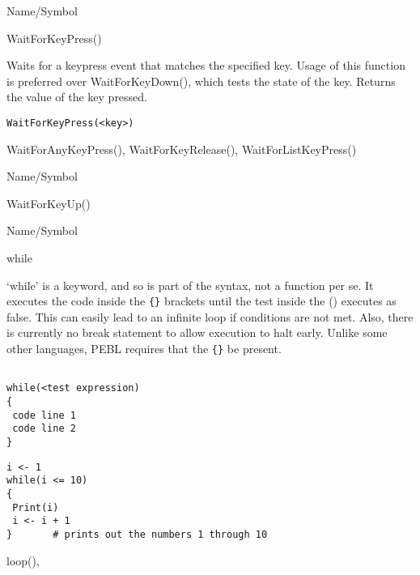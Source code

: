 \rl


\begin{desc}{Name/Symbol}
\item[Name/Symbol]  	WaitForKeyPress()

\item[Description]  	Waits for a keypress event that matches the specified key. 
			Usage of this function is preferred over WaitForKeyDown(), 
			which tests the state of the key. Returns the value of the key 
			pressed.	      

\item[Usage]
\begin{verbatim}
WaitForKeyPress(<key>)
\end{verbatim}

\item[Example]	

\item[See Also]     	WaitForAnyKeyPress(), WaitForKeyRelease(), WaitForListKeyPress()
\end{desc}

\rl


\begin{desc}{Name/Symbol}
\item[Name/Symbol] 	WaitForKeyUp()

\item[Description]	

\item[Usage]		

\item[Example]	

\item[See Also]	
\end{desc}

\rl


\begin{desc}{Name/Symbol}
\item[Name/Symbol]	while

\item[Description] 	`while' is a keyword, and so is part of the syntax, not a 
		function per se.  It executes the code inside the \verb+{}+ brackets 
		until the test inside the () executes as false.  This can 
		easily lead to an infinite loop if conditions are not met.  
		Also, there is currently no break statement to allow execution 
		to halt early.  Unlike some other languages, PEBL requires 
		that the \verb+{}+ be present.

\item[Usage]
\begin{verbatim}

while(<test expression)
{
 code line 1
 code line 2
}
\end{verbatim}

\item[Example] 
\begin{verbatim}
i <- 1
while(i <= 10)
{
 Print(i)
 i <- i + 1
}		# prints out the numbers 1 through 10
\end{verbatim}

\item[See Also] 	loop(), {}


\end{desc}

\rl




